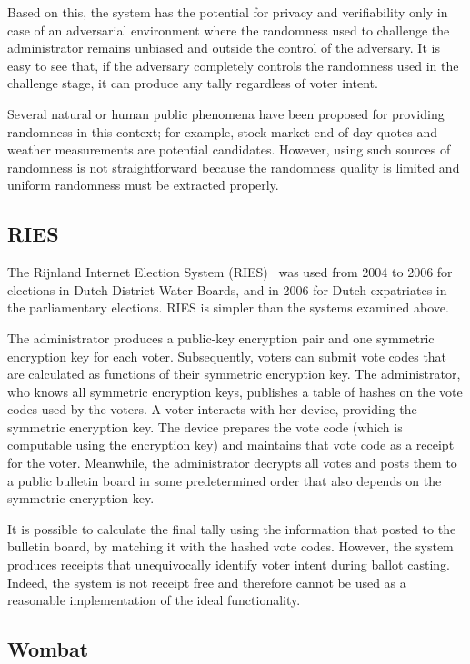 Based on this, the system has the potential for privacy and
verifiability only in case of an adversarial environment where the
randomness used to challenge the administrator remains unbiased and
outside the control of the adversary. It is easy to see that, if the
adversary completely controls the randomness used in the challenge
stage, it can produce any tally regardless of voter intent.

Several natural or human public phenomena have been proposed for
providing randomness in this context; for example, stock market
end-of-day quotes and weather measurements are potential candidates.
However, using such sources of randomness is not straightforward
because the randomness quality is limited and uniform randomness must
be extracted properly.

\subsection{RIES}

The Rijnland Internet Election System (RIES)~\cite{gonggrijp2009} was
used from 2004 to 2006 for elections in Dutch District Water Boards,
and in 2006 for Dutch expatriates in the parliamentary elections. RIES
is simpler than the systems examined above.

The administrator produces a public-key encryption pair and one
symmetric encryption key for each voter. Subsequently, voters can
submit vote codes that are calculated as functions of their symmetric
encryption key. The administrator, who knows all symmetric encryption
keys, publishes a table of hashes on the vote codes used by the
voters. A voter interacts with her device, providing the symmetric
encryption key. The device prepares the vote code (which is computable
using the encryption key) and maintains that vote code as a receipt
for the voter. Meanwhile, the administrator decrypts all votes and
posts them to a public bulletin board in some predetermined order that
also depends on the symmetric encryption key.

It is possible to calculate the final tally using the information that
posted to the bulletin board, by matching it with the hashed vote
codes. However, the system produces receipts that unequivocally
identify voter intent during ballot casting. Indeed, the system is not
receipt free and therefore cannot be used as a reasonable
implementation of the ideal functionality.

\subsection{Wombat}

